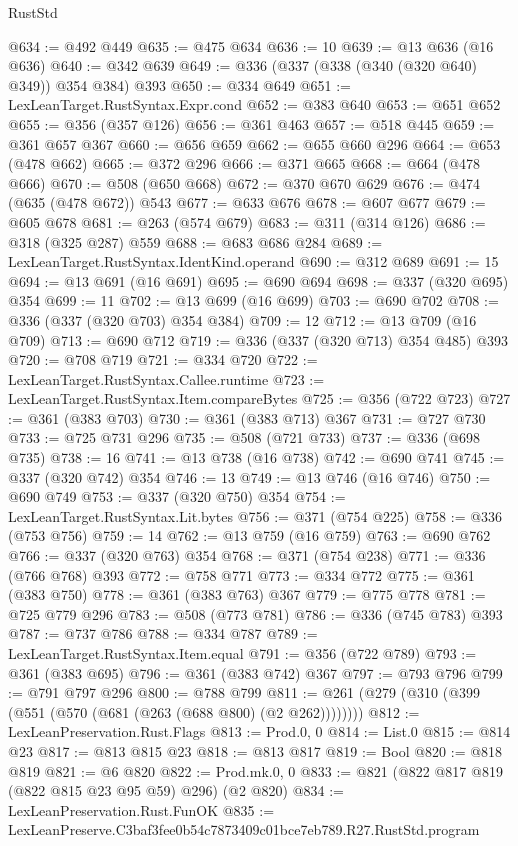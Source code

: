 \begin{lexlean}{RustStd}
\begin{coremodule}
@634 := @492 @449
@635 := @475 @634
@636 := 10
@639 := @13 @636 (@16 @636)
@640 := @342 @639
@649 := @336 (@337 (@338 (@340 (@320 @640) @349)) @354 @384) @393
@650 := @334 @649
@651 := LexLeanTarget.RustSyntax.Expr.cond
@652 := @383 @640
@653 := @651 @652
@655 := @356 (@357 @126)
@656 := @361 @463
@657 := @518 @445
@659 := @361 @657 @367
@660 := @656 @659
@662 := @655 @660 @296
@664 := @653 (@478 @662)
@665 := @372 @296
@666 := @371 @665
@668 := @664 (@478 @666)
@670 := @508 (@650 @668)
@672 := @370 @670 @629
@676 := @474 (@635 (@478 @672)) @543
@677 := @633 @676
@678 := @607 @677
@679 := @605 @678
@681 := @263 (@574 @679)
@683 := @311 (@314 @126)
@686 := @318 (@325 @287) @559
@688 := @683 @686 @284
@689 := LexLeanTarget.RustSyntax.IdentKind.operand
@690 := @312 @689
@691 := 15
@694 := @13 @691 (@16 @691)
@695 := @690 @694
@698 := @337 (@320 @695) @354
@699 := 11
@702 := @13 @699 (@16 @699)
@703 := @690 @702
@708 := @336 (@337 (@320 @703) @354 @384)
@709 := 12
@712 := @13 @709 (@16 @709)
@713 := @690 @712
@719 := @336 (@337 (@320 @713) @354 @485) @393
@720 := @708 @719
@721 := @334 @720
@722 := LexLeanTarget.RustSyntax.Callee.runtime
@723 := LexLeanTarget.RustSyntax.Item.compareBytes
@725 := @356 (@722 @723)
@727 := @361 (@383 @703)
@730 := @361 (@383 @713) @367
@731 := @727 @730
@733 := @725 @731 @296
@735 := @508 (@721 @733)
@737 := @336 (@698 @735)
@738 := 16
@741 := @13 @738 (@16 @738)
@742 := @690 @741
@745 := @337 (@320 @742) @354
@746 := 13
@749 := @13 @746 (@16 @746)
@750 := @690 @749
@753 := @337 (@320 @750) @354
@754 := LexLeanTarget.RustSyntax.Lit.bytes
@756 := @371 (@754 @225)
@758 := @336 (@753 @756)
@759 := 14
@762 := @13 @759 (@16 @759)
@763 := @690 @762
@766 := @337 (@320 @763) @354
@768 := @371 (@754 @238)
@771 := @336 (@766 @768) @393
@772 := @758 @771
@773 := @334 @772
@775 := @361 (@383 @750)
@778 := @361 (@383 @763) @367
@779 := @775 @778
@781 := @725 @779 @296
@783 := @508 (@773 @781)
@786 := @336 (@745 @783) @393
@787 := @737 @786
@788 := @334 @787
@789 := LexLeanTarget.RustSyntax.Item.equal
@791 := @356 (@722 @789)
@793 := @361 (@383 @695)
@796 := @361 (@383 @742) @367
@797 := @793 @796
@799 := @791 @797 @296
@800 := @788 @799
@811 := @261 (@279 (@310 (@399 (@551 (@570 (@681 (@263 (@688 @800) (@2 @262))))))))
@812 := LexLeanPreservation.Rust.Flags
@813 := Prod.{0, 0}
@814 := List.{0}
@815 := @814 @23
@817 := @813 @815 @23
@818 := @813 @817
@819 := Bool
@820 := @818 @819
@821 := @6 @820
@822 := Prod.mk.{0, 0}
@833 := @821 (@822 @817 @819 (@822 @815 @23 @95 @59) @296) (@2 @820)
@834 := LexLeanPreservation.Rust.FunOK
@835 := LexLeanPreserve.C3baf3fee0b54c7873409c01bce7eb789.R27.RustStd.program

\end{coremodule}
\end{lexlean}
